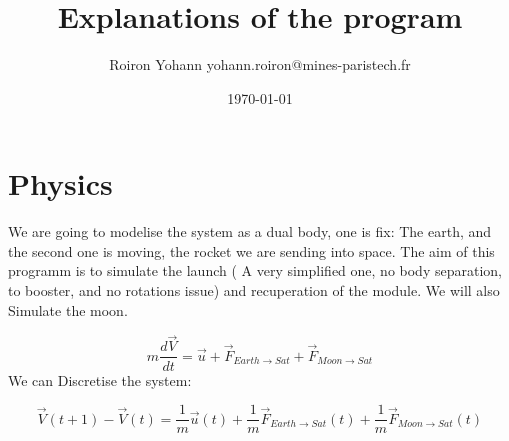 \documentclass{scrartcl}
\begin{document}
\title{Explanations of the program}
\date{\today{}}

\author{Roiron Yohann yohann.roiron@mines-paristech.fr}

\maketitle

\section{Physics}
We are going to modelise the system as a dual body, one is fix: The earth, and the second one is moving, the rocket we are sending into space.
The aim of this programm is to simulate the launch ( A very simplified one, no body separation, to booster, and no rotations issue) and recuperation of the module. We will also Simulate the moon.

$$m\frac{d\vec V}{dt}=\vec u+ \vec F_{Earth \rightarrow Sat} + \vec F _{Moon \rightarrow Sat}$$
We can Discretise the system:

$$\vec V(t+1) - \vec V(t)=\frac{1}{m}\vec u(t)+ \frac{1}{m}\vec F_{Earth \rightarrow Sat}(t) + \frac{1}{m}\vec F _{Moon \rightarrow Sat}(t)$$
\end{document}
